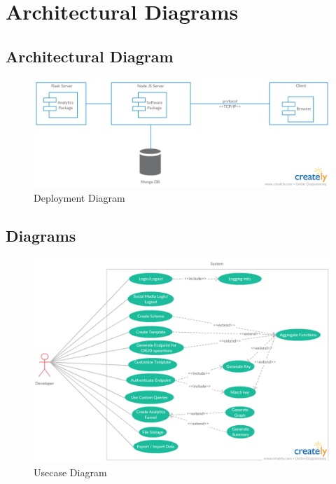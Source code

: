 \documentclass[a4paper,12pt]{report}
\begin{document}
    \chapter {Architectural Diagrams}
    
    \section{Architectural Diagram}        
      \begin{figure}[h]
        \includegraphics[width=1\textwidth]{Deployment.png}
        \caption{ Deployment Diagram}  
      \end{figure}
    
    \newpage
    \section{Diagrams}              
    \begin{figure}[h]
      \includegraphics[width=1\textwidth]{usecase.png}
      \caption{ Usecase Diagram}  
    \end{figure}
\end{document}
